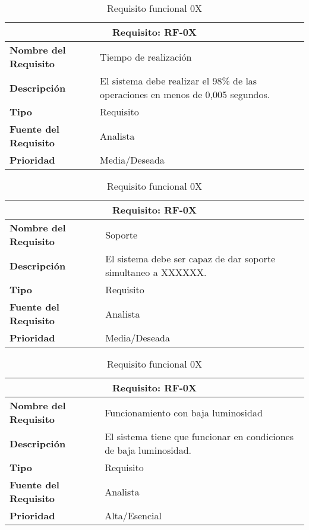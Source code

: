 \begin{table}[H]
\begin{center}
\begin{tabular}{p{} p{7cm}}
\multicolumn{2}{c}{\textbf{Requisito: RF-0X} } \\
\hline \hline
\textbf{Nombre del Requisito} & Tiempo de realización\\
\hline
\textbf{Descripción} &  El sistema debe realizar el 98\% de las operaciones en menos de 0,005 segundos.\\
\hline
\textbf{Tipo} & Requisito  \\
\hline
\textbf{Fuente del Requisito} & Analista  \\
\hline
\textbf{Prioridad} & Media/Deseada \\ \hline
\end{tabular}
\caption{Requisito funcional 0X}
\label{tab:personal}
\end{center}
\end{table}

\begin{table}[H]
\begin{center}
\begin{tabular}{p{} p{7cm}}
\multicolumn{2}{c}{\textbf{Requisito: RF-0X} } \\
\hline \hline
\textbf{Nombre del Requisito} & Soporte\\
\hline
\textbf{Descripción} & El sistema debe ser capaz de dar soporte simultaneo a XXXXXX.\\
\hline
\textbf{Tipo} & Requisito  \\
\hline
\textbf{Fuente del Requisito} & Analista  \\
\hline
\textbf{Prioridad} & Media/Deseada \\ \hline
\end{tabular}
\caption{Requisito funcional 0X}
\label{tab:personal}
\end{center}
\end{table}

\begin{table}[H]
\begin{center}
\begin{tabular}{p{} p{7cm}}
\multicolumn{2}{c}{\textbf{Requisito: RF-0X} } \\
\hline \hline
\textbf{Nombre del Requisito} & Funcionamiento con baja luminosidad\\
\hline
\textbf{Descripción} & El sistema tiene que funcionar en condiciones de baja luminosidad.\\
\hline
\textbf{Tipo} & Requisito  \\
\hline
\textbf{Fuente del Requisito} & Analista  \\
\hline
\textbf{Prioridad} & Alta/Esencial \\ \hline
\end{tabular}
\caption{Requisito funcional 0X}
\label{tab:personal}
\end{center}
\end{table}

